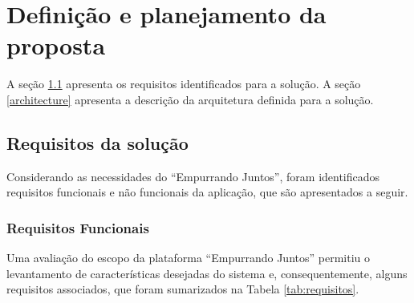 \chapter{Definição e planejamento da proposta} \label{cap:proposta}

 A seção \ref{requirements} apresenta os requisitos identificados para a solução.
 A seção \ref{architecture} apresenta a descrição da arquitetura definida para a solução.

\section{Requisitos da solução} \label{requirements}

    Considerando as necessidades do ``Empurrando Juntos'',
    foram identificados requisitos funcionais e não funcionais da aplicação,
    que são apresentados a seguir.

    \subsection*{Requisitos Funcionais} \label{functional_requirements}

    Uma avaliação do escopo da plataforma ``Empurrando Juntos'' permitiu o levantamento de características desejadas do sistema e,
    consequentemente, alguns requisitos associados, que foram sumarizados na Tabela \ref{tab:requisitos}.

